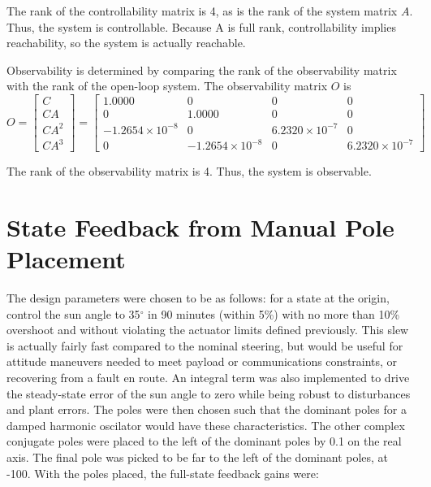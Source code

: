 \documentclass[]{aiaa-tc}%
\begin{document}
The rank of the controllability matrix is 4, as is the rank of the system matrix $A$. Thus, the system is controllable. Because A is full rank, controllability implies reachability, so the system is actually reachable.

	\vspace{5 mm}

	Observability is determined by comparing the rank of the observability matrix with the rank of the open-loop system. The observability matrix $O$ is
	\begin{equation}
O=\begin{bmatrix}
C\\ 
CA\\ 
CA^2\\ 
CA^3
\end{bmatrix}=\begin{bmatrix}
    1.0000 &             0 &            0 &           0\\ 
             0 &    1.0000 &            0 &           0\\ 
   -1.2654\times10^{-8} &             0 &   6.2320\times10^{-7} &           0\\ 
             0 &   -1.2654\times10^{-8} &            0 &  6.2320\times10^{-7}
\end{bmatrix}
	\end{equation}

The rank of the observability matrix is 4. Thus, the system is observable.

	\section{State Feedback from Manual Pole Placement}
	The design parameters were chosen to be as follows: for a state at the origin, control the sun angle to 35$^{\circ}$ in 90 minutes (within 5\%) with no more than 10\% overshoot and without violating the actuator limits defined previously. This slew is actually fairly fast compared to the nominal steering, but would be useful for attitude maneuvers needed to meet payload or communications constraints, or recovering from a fault en route. An integral term was also implemented to drive the steady-state error of the sun angle to zero while being robust to disturbances and plant errors. The poles were then chosen such that the dominant poles for a damped harmonic oscilator would have these characteristics. The other complex conjugate poles were placed to the left of the dominant poles by 0.1 on the real axis. The final pole was picked to be far to the left of the dominant poles, at -100. With the poles placed, the full-state feedback gains were:
\end{document}
